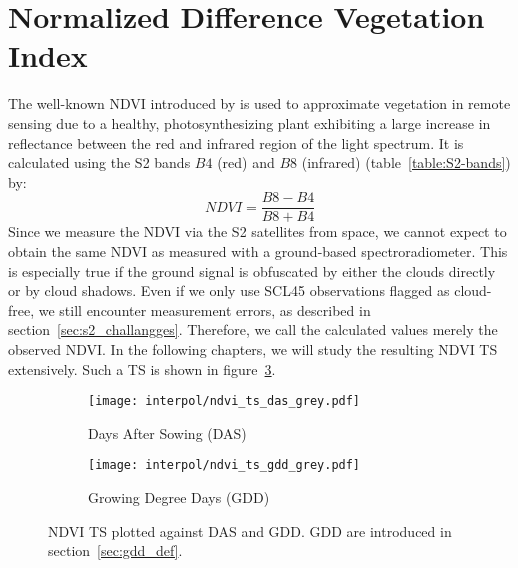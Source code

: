 \section{Normalized Difference Vegetation Index}{%
	The well-known {NDVI} introduced by \cite{rouseMonitoringVernalAdvancement1974} is used to approximate vegetation in remote sensing due to a healthy, photosynthesizing plant exhibiting a large increase in reflectance between the red and infrared region of the light spectrum. It is calculated using the S2 bands $B4$ (red) and $B8$ (infrared) (table~\ref{table:S2-bands}) by:
	\begin{equation}
		NDVI = \frac{B8 - B4}{B8 + B4}
		\label{eq:ndvi}
	\end{equation}
	Since we measure the NDVI via the S2 satellites from space, we cannot expect to obtain the same NDVI as measured with a ground-based spectroradiometer. This is especially true if the ground signal is obfuscated by either the clouds directly or by cloud shadows. Even if we only use SCL45 observations flagged as cloud-free, we still encounter measurement errors, as described in section~\ref{sec:s2_challangges}. Therefore, we call the calculated values merely the {observed NDVI}. In the following chapters, we will study the resulting NDVI {TS} extensively. Such a {TS} is shown in figure~\ref{fig:raw_ndvi_ts}.
	\begin{figure}[!h]
		\centering
		\begin{subfigure}{.47\textwidth}
			\texttt{[image: interpol/ndvi\_ts\_das\_grey.pdf]}
			\caption{Days After Sowing (DAS)}
			\label{interpol/ndvi_ts_das_grey.pdf}
		\end{subfigure}%
		\hfill
		\begin{subfigure}{.47\textwidth}
			\texttt{[image: interpol/ndvi\_ts\_gdd\_grey.pdf]}
			\caption{Growing Degree Days (GDD)}
			\label{interpol/ndvi_ts_gdd_grey.pdf}
		\end{subfigure}
		\caption[NDVI {TS} plotted against DAS and GDD]{NDVI {TS} plotted against DAS and GDD. GDD are introduced in section~\ref{sec:gdd_def}.}
		\label{fig:raw_ndvi_ts}
	\end{figure}
}

